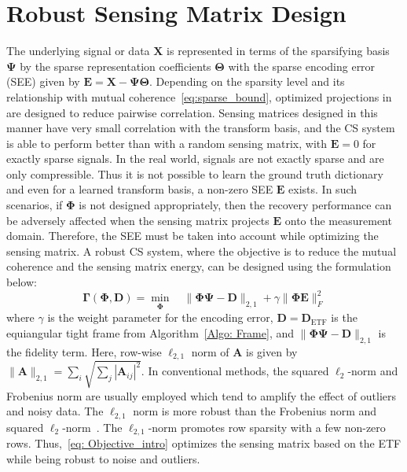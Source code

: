 \section{Robust Sensing Matrix Design}
%
The underlying signal or data $\bm{X}$ is represented in terms of the sparsifying basis $\bm{\Psi}$ by the sparse representation coefficients $\bm{\Theta}$ with the sparse encoding error (SEE) given by $\bm{E}=\bm{X}-\bm{\Psi}\bm{\Theta}$. Depending on the sparsity level and its relationship with mutual coherence~\eqref{eq:sparse_bound}, optimized projections in~\cite{Elad,Xuprojection,Sapiro,Zelnik} are designed to reduce pairwise correlation. Sensing matrices designed in this manner have very small correlation with the transform basis, and the CS system is able to perform better than with a random sensing matrix, with $\bm{E}=0$ for exactly sparse signals. In the real world, signals are not exactly sparse and are only compressible. Thus it is not possible to learn the ground truth dictionary and even for a learned transform basis, a non-zero SEE $\bm{E}$ exists. In such scenarios, if $\bm{\Phi}$ is not designed appropriately, then the recovery performance can be adversely affected when the sensing matrix projects $\bm{E}$ onto the measurement domain. Therefore, the SEE must be taken into account while optimizing the sensing matrix. A robust CS system, where the objective is to reduce the mutual coherence and the sensing matrix energy, can be designed using the formulation below:
%
\begin{equation}
    \label{eq: Objective_intro}
           \bm{\Gamma}(\bm{\Phi}, \bm{D}) =  \underset{\bm{\Phi}}{\min}\quad \|\bm{\Phi}\bm{\Psi}-\bm{D}\|_{2,1} + \gamma\|\bm{\Phi}\bm{E}\|_{F}^{2}
\end{equation}
%
where $\gamma$ is the weight parameter for the encoding error, $\bm{D} = \bm{D}_{\text{ETF}}$ is the equiangular tight frame from Algorithm~\ref{Algo: Frame}, and $\|\bm{\Phi}\bm{\Psi}-\bm{D}\|_{2,1} $ is the fidelity term. Here, row-wise $\ell_{2,1}$ norm of $\bm{A}$ is given by $\|\bm{A}\|_{2,1} = \sum_{i} \sqrt{\sum_{j} |\bm{A}_{ij}|^{2}}$. In conventional methods, the squared $\ell_{2}$-norm and Frobenius norm are usually employed which tend to amplify the effect of outliers and noisy data. The $\ell_{2,1}$ norm is more robust than the Frobenius norm and squared $\ell_{2}$-norm~\cite{RSLDA, RDR}. The $\ell_{2,1}$-norm promotes row sparsity with a few non-zero rows. Thus,~\eqref{eq: Objective_intro} optimizes the sensing matrix based on the ETF while being robust to noise and outliers.

